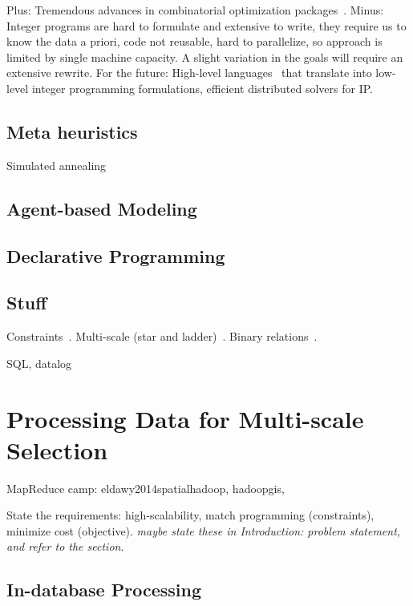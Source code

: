 \documentclass[11pt, oneside]{report}
\begin{document}
Plus: Tremendous advances in combinatorial optimization packages~\cite{cplex}.
Minus: Integer programs are hard to formulate and extensive to write, they require us to know the data a priori, code not reusable, hard to parallelize, so approach is limited by single machine capacity. A slight variation in the goals will require an extensive rewrite.
For the future: High-level languages~\cite{meliou2011reverse} that translate into low-level integer programming formulations, efficient distributed solvers for IP.

\subsection{Meta heuristics}

Simulated annealing~\cite{ware2003generalization_sa}

\subsection{Agent-based Modeling}

\subsection{Declarative Programming}

\subsection{Stuff}

Constraints~\cite{harrie1999constraint, woodruff1998constant, topfer1966principles, sarma2012fusiontables, nutanong2012multiresolution}.
Multi-scale (star and ladder)~\cite{foerster2010challenges, sarma2012fusiontables}.
Binary relations~\cite{egenhofer1991categorizing, randell1992spatial}. 

SQL, datalog


\section{Processing Data for Multi-scale Selection}
\label{related:work:processing}

MapReduce camp: eldawy2014spatialhadoop, hadoopgis, 

State the requirements: high-scalability, match programming (constraints), minimize cost (objective).
\emph{maybe state these in Introduction: problem statement, and refer to the section}.

\subsection{In-database Processing}
\end{document}
